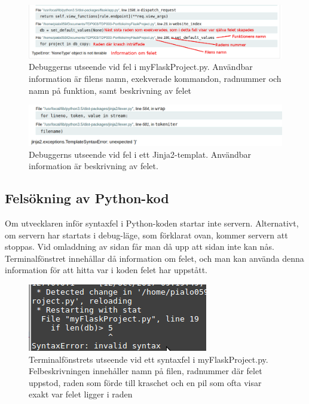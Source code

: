 \begin{figure}
  \centering
  \includegraphics{flaskdebug1}
  \caption{Debuggerns utseende vid fel i myFlaskProject.py. Användbar information är filens namn, exekverade kommandon, radnummer och namn på funktion, samt beskrivning av felet}
\end{figure}

\begin{figure}
  \centering
  \includegraphics{flaskdebug2}
  \caption{Debuggerns utseende vid fel i ett Jinja2-templat. Användbar information är beskrivning av felet.}
\end{figure}
  

\subsection{Felsökning av Python-kod}
Om utvecklaren inför syntaxfel i Python-koden startar inte servern. Alternativt, om servern har startats i debug-läge, som förklarat ovan, kommer servern att stoppas. Vid omladdning av sidan får man då upp att sidan inte kan nås.
Terminalfönstret innehållar då information om felet, och man kan använda denna information för att hitta var i koden felet har uppstått.

\begin{figure}
  \centering
  \includegraphics{python_error}
  \caption{Terminalfönstrets utseende vid ett syntaxfel i myFlaskProject.py. Felbeskrivningen innehåller namn på filen, radnummer där felet uppstod, raden som förde till kraschet och en pil som ofta visar exakt var felet ligger i raden}
\end{figure}

